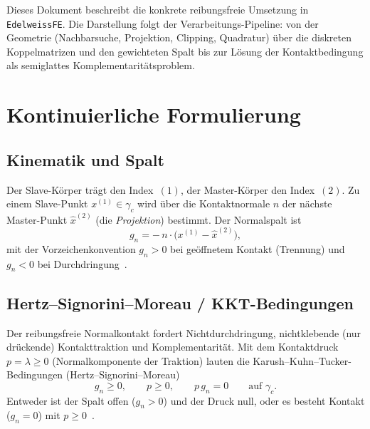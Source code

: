 \documentclass[a4paper,11pt]{article}
\def\bm#1{#1}%
\newcommand{\code}[1]{\texttt{\small #1}}
\let\stdsection\section
\renewcommand{\section}{\clearpage\stdsection}
\begin{document}
Dieses Dokument beschreibt die konkrete reibungsfreie Umsetzung in \code{EdelweissFE}. Die Darstellung
folgt der Verarbeitungs-Pipeline: von der Geometrie (Nachbarsuche, Projektion, Clipping,
Quadratur) über die diskreten Koppelmatrizen und den gewichteten Spalt bis zur Lösung der
Kontaktbedingung als semiglattes Komplementaritätsproblem.

\section{Kontinuierliche Formulierung}
\label{sec:kontinuierlich}

\subsection{Kinematik und Spalt}
Der Slave-Körper trägt den Index~$(1)$, der Master-Körper den Index~$(2)$. Zu einem Slave-Punkt
$\bm x^{(1)}\in\gamma_c$ wird über die Kontaktnormale $\bm n$ der nächste Master-Punkt
$\hat{\bm x}^{(2)}$ (die \emph{Projektion}) bestimmt. Der Normalspalt ist
\begin{equation}
g_n = -\,\bm n\cdot\big(\bm x^{(1)} - \hat{\bm x}^{(2)}\big),
\label{eq:gap}
\end{equation}
mit der Vorzeichenkonvention $g_n>0$ bei geöffnetem Kontakt (Trennung) und $g_n<0$ bei
Durchdringung~\citep{wriggers,farah}.

\subsection{Hertz--Signorini--Moreau / KKT-Bedingungen}
Der reibungsfreie Normalkontakt fordert Nichtdurchdringung, nichtklebende (nur drückende)
Kontakttraktion und Komplementarität. Mit dem Kontaktdruck $p=\lambda\ge0$ (Normalkomponente der
Traktion) lauten die Karush--Kuhn--Tucker-Bedingungen (Hertz--Signorini--Moreau)
\begin{equation}
g_n \ge 0, \qquad p \ge 0, \qquad p\, g_n = 0 \qquad \text{auf } \gamma_c .
\label{eq:kkt}
\end{equation}
Entweder ist der Spalt offen ($g_n>0$) und der Druck null, oder es besteht Kontakt ($g_n=0$) mit
$p\ge0$~\citep[Kap.~4]{wriggers}.
\end{document}
